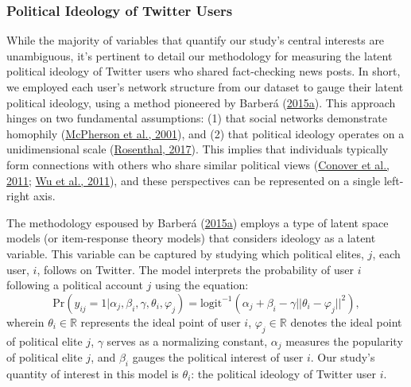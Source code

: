 \documentclass[
  12pt,
]{article}
\begin{document}
\hypertarget{political-ideology-of-twitter-users}{%
\subsubsection{Political Ideology of Twitter
Users}\label{political-ideology-of-twitter-users}}

While the majority of variables that quantify our study's central
interests are unambiguous, it's pertinent to detail our methodology for
measuring the latent political ideology of Twitter users who shared
fact-checking news posts. In short, we employed each user's network
structure from our dataset to gauge their latent political ideology,
using a method pioneered by Barberá
(\protect\hyperlink{ref-barbera2015birds}{2015a}). This approach hinges
on two fundamental assumptions: (1) that social networks demonstrate
homophily (\protect\hyperlink{ref-mcpherson2001birds}{McPherson et al.,
2001}), and (2) that political ideology operates on a unidimensional
scale (\protect\hyperlink{ref-rosenthal2017ideology}{Rosenthal, 2017}).
This implies that individuals typically form connections with others who
share similar political views
(\protect\hyperlink{ref-conover2011political}{Conover et al., 2011};
\protect\hyperlink{ref-wu2011says}{Wu et al., 2011}), and these
perspectives can be represented on a single left-right axis.

The methodology espoused by Barberá
(\protect\hyperlink{ref-barbera2015birds}{2015a}) employs a type of
latent space models (or item-response theory models) that considers
ideology as a latent variable. This variable can be captured by studying
which political elites, \(j\), each user, \(i\), follows on Twitter. The
model interprets the probability of user \(i\) following a political
account \(j\) using the equation: \begin{equation}
\text{Pr}(y_{ij} = 1 |\alpha_j, \beta_i, \gamma, \theta_i, \varphi_j) = \text{logit}^{-1}\left(\alpha_j + \beta_i - \gamma||\theta_i - \varphi_j||^2\right),
\end{equation} wherein \(\theta_i \in \mathbb{R}\) represents the ideal
point of user \(i\), \(\varphi_j \in \mathbb{R}\) denotes the ideal
point of political elite \(j\), \(\gamma\) serves as a normalizing
constant, \(\alpha_j\) measures the popularity of political elite \(j\),
and \(\beta_i\) gauges the political interest of user \(i\). Our study's
quantity of interest in this model is \(\theta_i\): the political
ideology of Twitter user \(i\).
\end{document}
